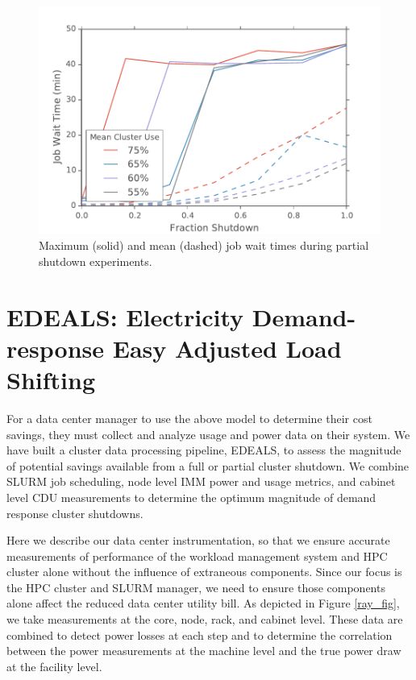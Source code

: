 \documentclass[letterpaper,twocolumn,10pt]{article}
\begin{document}
\begin{figure}[t]
	\begin{center}
		\includegraphics[scale=0.55]{down_v_wait}
	\end{center}
	\caption{Maximum (solid) and mean (dashed) job wait times during partial shutdown experiments.}
	\label{down_v_wait}
\end{figure}

\section{EDEALS: Electricity Demand-response Easy Adjusted Load Shifting}

For a data center manager to use the above model to determine their cost savings, they must collect and analyze usage and power data on their system.  We have built a cluster data processing pipeline, EDEALS, to assess the magnitude of potential savings available from a full or partial cluster shutdown.  We combine SLURM job scheduling, node level IMM power and usage metrics, and cabinet level CDU measurements to determine the optimum magnitude of demand response cluster shutdowns.  

Here we describe our data center instrumentation, so that we ensure accurate measurements of performance of the workload management system and HPC cluster alone without the influence of extraneous components. Since our focus is the HPC cluster and SLURM manager, we need to ensure those components alone affect the reduced data center utility bill.  As depicted in Figure \ref{ray_fig}, we take measurements at the core, node, rack, and cabinet level.  These data are combined to detect power losses at each step and to determine the correlation between the power measurements at the machine level and the true power draw at the facility level.
\end{document}
